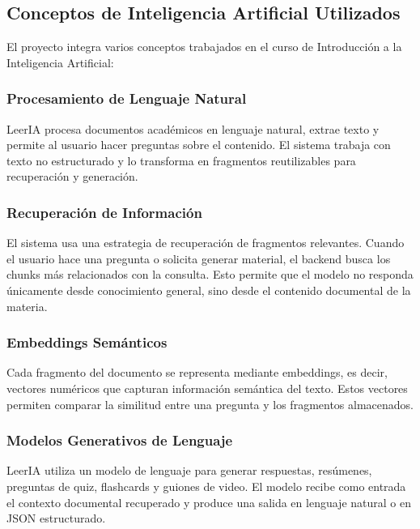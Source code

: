 \documentclass[12pt, letterpaper]{article}
\begin{document}
	\subsection{Conceptos de Inteligencia Artificial Utilizados}
	
	El proyecto integra varios conceptos trabajados en el curso de Introducción a la Inteligencia Artificial:
	
	\subsubsection{Procesamiento de Lenguaje Natural}
	
	LeerIA procesa documentos académicos en lenguaje natural, extrae texto y permite al usuario hacer preguntas sobre el contenido. El sistema trabaja con texto no estructurado y lo transforma en fragmentos reutilizables para recuperación y generación.
	
	\subsubsection{Recuperación de Información}
	
	El sistema usa una estrategia de recuperación de fragmentos relevantes. Cuando el usuario hace una pregunta o solicita generar material, el backend busca los chunks más relacionados con la consulta. Esto permite que el modelo no responda únicamente desde conocimiento general, sino desde el contenido documental de la materia.
	
	\subsubsection{Embeddings Semánticos}
	
	Cada fragmento del documento se representa mediante embeddings, es decir, vectores numéricos que capturan información semántica del texto. Estos vectores permiten comparar la similitud entre una pregunta y los fragmentos almacenados.
	
	\subsubsection{Modelos Generativos de Lenguaje}
	
	LeerIA utiliza un modelo de lenguaje para generar respuestas, resúmenes, preguntas de quiz, flashcards y guiones de video. El modelo recibe como entrada el contexto documental recuperado y produce una salida en lenguaje natural o en JSON estructurado.
	
\end{document}

